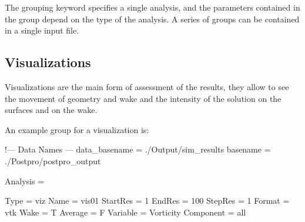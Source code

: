 The grouping keyword   specifies a single analysis, and the parameters contained in the group depend on the type of the analysis. A series of   groups can be contained in a single input file.

\subsection{Visualizations}

Visualizations are the main form of assessment of the results, they allow to see the movement of geometry and wake and the intensity of the solution on the surfaces and on the wake.

An example  group for a visualization is:

\begin{inputfile}[frame=single, caption={dust\_post.in for visualization}, label={file:dust_post.in_viz}]
!--- Data Names ---
data_basename = ./Output/sim_results
basename =     ./Postpro/postpro_output

Analysis = {

Type = viz  
Name = vis01
StartRes = 1
EndRes   = 100 
StepRes  = 1
Format = vtk
Wake = T
Average = F
Variable = Vorticity 
Component = all

}
\end{inputfile}

